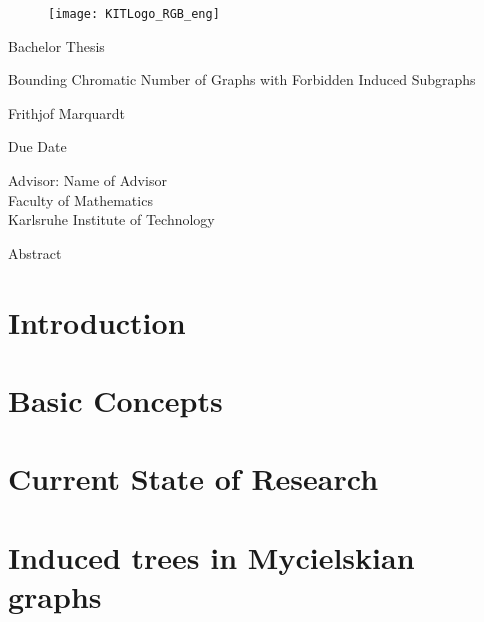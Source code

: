 \documentclass[12pt,a4paper]{scrartcl}
\theoremstyle{plain}
\theoremstyle{definition}
\numberwithin{equation}{section}
\begin{document}
  \pagestyle{empty}

  \begin{titlepage}

\begin{figure}[h]
\texttt{[image: KITLogo\_RGB\_eng]} 
\end{figure}
  
    \vspace*{2cm} 

 \begin{center} \large 
    
    Bachelor Thesis
    \vspace*{2cm}

    {\huge Bounding Chromatic Number of Graphs with Forbidden Induced Subgraphs}
    \vspace*{2.5cm}

    Frithjof Marquardt
    \vspace*{1.5cm}

    Due Date
    \vspace*{4.5cm}


    Advisor: Name of Advisor \\[1cm]
    Faculty of Mathematics \\[1cm]
		Karlsruhe Institute of Technology
  \end{center}
\end{titlepage}

Abstract
\newpage
  \tableofcontents

\newpage
 


  \pagestyle{headings}

\section{Introduction}

\newpage
\section{Basic Concepts}

\newpage 
\section{Current State of Research}


\newpage
\section{Induced trees in Mycielskian graphs}

  \newpage
\end{document}
